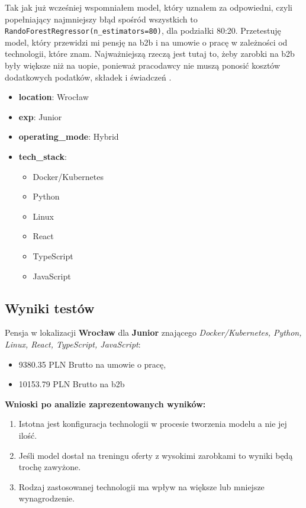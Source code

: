\documentclass[a4paper]{article}
\begin{document}
\quad Tak jak już wcześniej wspomniałem model, który uznałem za odpowiedni, czyli popełniający najmniejszy błąd
spośród wszystkich to \texttt{RandoForestRegressor(n\_estimators=80)}, dla podziałki 80:20.
Przetestuję model, który przewidzi mi pensję na b2b i na umowie o pracę w zależności od technologii, które znam. Najważniejszą rzeczą jest tutaj to, żeby zarobki na b2b były większe niż na uopie,
ponieważ pracodawcy nie muszą ponosić kosztów dodatkowych podatków, składek i świadczeń \cite{uop_vs_b2b}.

\begin{itemize}
    \item \textbf{location}: Wrocław
    \item \textbf{exp}: Junior
    \item \textbf{operating\_mode}: Hybrid
    \item \textbf{tech\_stack}:
          \begin{itemize}
              \item Docker/Kubernetes
              \item Python
              \item Linux
              \item React
              \item TypeScript
              \item JavaScript
          \end{itemize}
\end{itemize}

\subsection{Wyniki testów}

\quad Pensja w lokalizacji \textbf{Wrocław} dla \textbf{Junior} znającego \textit{Docker/Kubernetes, Python, Linux, React, TypeScript, JavaScript}:

\begin{itemize}
    \item 9380.35 PLN Brutto na umowie o pracę,
    \item 10153.79 PLN Brutto na b2b
\end{itemize}

\textbf{Wnioski po analizie zaprezentowanych wyników:}

\begin{enumerate}
    \item Istotna jest konfiguracja technologii w procesie tworzenia modelu a nie jej ilość.
    \item Jeśli model dostał na treningu oferty z wysokimi zarobkami to wyniki będą trochę zawyżone.
    \item Rodzaj zastosowanej technologii ma wpływ na większe lub mniejsze wynagrodzenie.
\end{enumerate}
\end{document}
